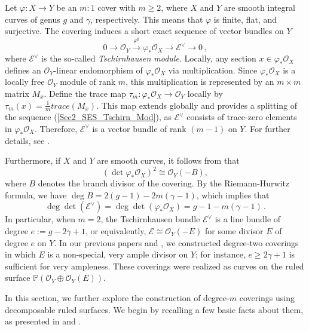 \documentclass[a4paper,12pt]{amsart}
\begin{document}
Let $\varphi : X \to Y$ be an $m:1$ cover with $m \geq 2$, where $X$ and $Y$ are smooth integral curves of genus $g$ and $\gamma$, respectively. This means that $\varphi$ is finite, flat, and surjective. The covering induces a short exact sequence of vector bundles on $Y$
\begin{equation*}\label{Sec2_SES_Tschirn_Mod}
 0 \to \mathcal{O}_Y \xrightarrow{\varphi^{\sharp}} \varphi_{\ast} \mathcal{O}_X \to \mathcal{E}^{\vee} \to 0 \, ,
\end{equation*}
where $\mathcal{E}^{\vee}$ is the so-called \emph{Tschirnhausen module}. Locally, any section  $x \in \varphi_{\ast} \mathcal{O}_X$ defines an $\mathcal{O}_Y$-linear endomorphism of $\varphi_{\ast} \mathcal{O}_X$ via multiplication. Since $\varphi_{\ast} \mathcal{O}_X$ is a locally free $\mathcal{O}_Y$ module of rank $m$, this multiplication is represented by an $m \times m$ matrix $M_x$. Define the trace map $\tau_{m} : \varphi_{\ast} \mathcal{O}_X \to \mathcal{O}_Y$ locally by $\tau_{m}  (x) = \frac{1}{m}trace (M_x)$. This map extends globally and provides a splitting of the sequence {\rm (\ref{Sec2_SES_Tschirn_Mod})}, as $\mathcal{E}^{\vee}$ consists of trace-zero elements in $\varphi_{\ast} \mathcal{O}_X$. Therefore, $\mathcal{E}^{\vee}$ is a vector bundle of rank $(m-1)$ on $Y$. For further details, see \cite{HM99}.

Furthermore, if $X$ and $Y$ are smooth curves, it follows from \cite[Ex. IV.2.6, p. 306]{Hart77} that
\[
 (\det \varphi_{\ast} \mathcal{O}_X )^2 \cong \mathcal{O}_Y (-B) ,
\]
where $B$ denotes the branch divisor of the covering. By the Riemann-Hurwitz formula, we have $\deg B = 2(g - 1) - 2m (\gamma - 1)$, which implies that
\[
 \deg \det (\mathcal{E}^{\vee}) = \deg \det (\varphi_{\ast} \mathcal{O}_X) = g - 1 - m (\gamma - 1) \, .
\]
In particular, when $m = 2$, the Tschirnhausen bundle $\mathcal{E}^{\vee}$ is a line bundle  of degree $e := g - 2\gamma + 1$, or equivalently, $\mathcal{E} \cong \mathcal{O}_Y (-E)$ for some divisor $E$ of degree $e$ on $Y$. In our previous papers \cite{CIK21} and \cite{CIK24a}, we constructed degree-two coverings in which $E$ is a non-special, very ample divisor on $Y$; for instance, $e \geq 2\gamma +1$ is sufficient for very ampleness. These coverings were realized as curves on the ruled surface $\mathbb{P} (\mathcal{O}_Y \oplus \mathcal{O}_Y (E))$.

In this section, we further explore the construction of degree-$m$ coverings using decomposable ruled surfaces. We begin by recalling a few basic facts about them, as presented in \cite[Ch.V.2]{Hart77} and \cite{GP2005}.
\end{document}

